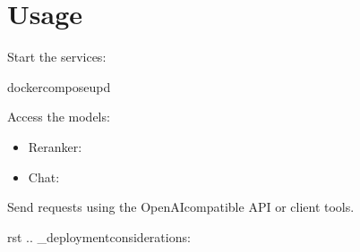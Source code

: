 \documentclass[letterpaper,10pt,english]{sphinxmanual}
\begin{document}
\section{Usage}
\label{\detokenize{multiple-models-llamacpp:usage}}
\sphinxAtStartPar
Start the services:

\begin{sphinxVerbatim}[commandchars=\\\{\}]
dockercomposeup\PYGZhy{}d
\end{sphinxVerbatim}

\sphinxAtStartPar
Access the models:
\begin{itemize}
\item {} 
\sphinxAtStartPar
Reranker: 

\item {} 
\sphinxAtStartPar
Chat:     

\end{itemize}

\sphinxAtStartPar
Send requests using the OpenAI\sphinxhyphen{}compatible API or  client tools.

\sphinxstepscope

\sphinxAtStartPar
{\color{red}\bfseries{}\textasciigrave{}\textasciigrave{}}{\color{red}\bfseries{}\textasciigrave{}}rst
.. \_deployment\sphinxhyphen{}considerations:
\end{document}
